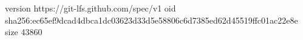 version https://git-lfs.github.com/spec/v1
oid sha256:ec65ef9dcad4dbca1dc03623d33d5e58806c6d7385ed62d45519ffc01ac22e8e
size 43860
